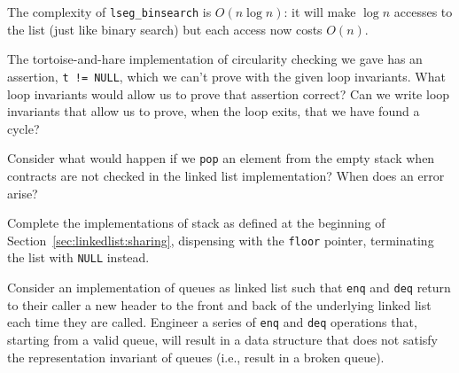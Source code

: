 \begin{flex}
\begin{solution}

\par\medskip\noindent\usebox{\lstbox}\par
The complexity of \lstinline'lseg_binsearch' is $O(n \log n)$: it will
make $\log n$ accesses to the list (just like binary search) but each
access now costs $O(n)$.
\end{solution}
\end{flex}


\begin{exercise}
  The tortoise-and-hare implementation of circularity checking we gave
  has an assertion, \lstinline't != NULL', which we can't prove with
  the given loop invariants. What loop invariants would allow us to
  prove that assertion correct? Can we write loop invariants that
  allow us to prove, when the loop exits, that we have found a cycle?
\end{exercise}

\begin{exercise}
  Consider what would happen if we \lstinline'pop' an element from the
  empty stack when contracts are not checked in the linked list
  implementation?  When does an error arise?
\end{exercise}

\begin{exercise}
  Complete the implementations of stack as defined at the beginning of
  Section~\ref{sec:linkedlist:sharing}, dispensing with the
  \lstinline'floor' pointer, terminating the list with
  \lstinline'NULL' instead.
\end{exercise}

\begin{exercise}
  Consider an implementation of queues as linked list such that
  \lstinline'enq' and \lstinline'deq' return to their caller a new
  header to the front and back of the underlying linked list each time
  they are called.  Engineer a series of \lstinline'enq' and
  \lstinline'deq' operations that, starting from a valid queue, will
  result in a data structure that does not satisfy the representation
  invariant of queues (i.e., result in a broken queue).
\end{exercise}


